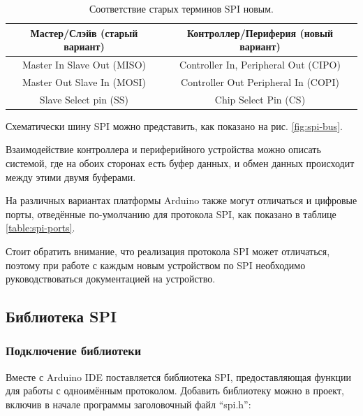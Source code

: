 \documentclass[../sparc.tex]{subfiles}
\begin{document}
\begin{table}[H]
  \centering
  \begin{tabular}{ | c | c | }
    \hline
    \textbf{Мастер/Слэйв (старый вариант)}
    & \textbf{Контроллер/Периферия (новый вариант)} \\
    \hline
    Master In Slave Out (MISO) & Controller In, Peripheral Out (CIPO) \\
    \hline
    Master Out Slave In (MOSI) & Controller Out Peripheral In (COPI) \\
    \hline
    Slave Select pin (SS) & Chip Select Pin (CS) \\
    \hline
  \end{tabular}
  \caption{Соответствие старых терминов SPI новым.}
  \label{table:spi-old-terminology}
\end{table}

Схематически шину SPI можно представить, как показано на рис. \ref{fig:spi-bus}.


Взаимодействие контроллера и периферийного устройства можно описать системой,
где на обоих сторонах есть буфер данных, и обмен данных происходит между этими
двумя буферами.

На различных вариантах платформы Arduino также могут отличаться и цифровые
порты, отведённые по-умолчанию для протокола SPI\cite{arduino:reference}, как
показано в таблице \ref{table:spi-ports}.


Стоит обратить внимание, что реализация протокола SPI может отличаться, поэтому
при работе с каждым новым устройством по SPI необходимо руководствоваться
документацией на устройство.

\subsection{Библиотека SPI}

\subsubsection{Подключение библиотеки}

Вместе с Arduino IDE поставляется библиотека SPI\cite{arduino:reference},
предоставляющая функции для работы с одноимённым протоколом.  Добавить
библиотеку можно в проект, включив в начале программы заголовочный файл
``spi.h'':
\end{document}
